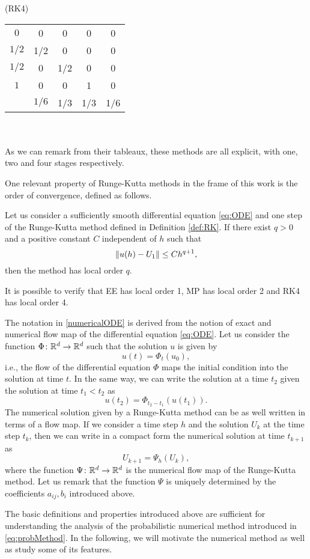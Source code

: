 \begin{minipage}{0.5\linewidth} 
	\begin{center}
		(RK4)
		\begin{tabular}{c|cccc}
			$0$ & 0 & 0 & 0 & 0\\
			$1/2$ & 1/2 & 0 & 0 & 0\\
			$1/2$ & 0 & 1/2 & 0 & 0\\
			$1$ & 0 & 0 & 1 & 0\\
			\hline 
			&$1/6$ & 1/3 & 1/3 & 1/6
		\end{tabular}
	\end{center}
\end{minipage} \\ \\
As we can remark from their tableaux, these methods are all explicit, with one, two and four stages respectively.

One relevant property of Runge-Kutta methods in the frame of this work is the order of convergence, defined as follows. 
\begin{definition} Let us consider a sufficiently smooth differential equation \eqref{eq:ODE} and one step of the Runge-Kutta method defined in Definition \ref{def:RK}. If there exist $q > 0$ and a positive constant $C$ independent of $h$ such that 
\begin{equation}
	\norm{u(h)-U_1} \leq Ch^{q+1},
\end{equation}
then the method has local order $q$. 
\end{definition} 
\noindent It is possible to verify \cite{HLW02} that EE has local order 1, MP has local order 2 and RK4 has local order 4. 

The notation in \eqref{numericalODE} is derived from the notion of exact and numerical flow map of the differential equation \eqref{eq:ODE}. Let us consider the function $\Phi \colon \mathbb{R}^d \to \mathbb{R}^d$ such that the solution $u$ is given by
\begin{equation}
	u(t) = \Phi_t(u_0),
\end{equation}
i.e., the flow of the differential equation $\Phi$ maps the initial condition into the solution at time $t$. In the same way, we can write the solution at a time $t_2$ given the solution at time $t_1 < t_2$ as 
\begin{equation}
	u(t_2) = \Phi_{t_2 - t_1}(u(t_1)).
\end{equation}
The numerical solution given by a Runge-Kutta method can be as well written in terms of a flow map. If we consider a time step $h$ and the solution $U_k$ at the time step $t_k$, then we can write in a compact form the numerical solution at time $t_{k+1}$ as
\begin{equation}
	U_{k+1} = \Psi_h(U_k),
\end{equation}
where the function $\Psi\colon\mathbb{R}^d\to\mathbb{R}^d$ is the numerical flow map of the Runge-Kutta method. Let us remark that the function $\Psi$ is uniquely determined by the coefficients $a_{ij}, b_i$ introduced above.

The basic definitions and properties introduced above are sufficient for understanding the analysis of the probabilistic numerical method introduced in \eqref{eq:probMethod}. In the following, we will motivate the numerical method as well as study some of its features.
